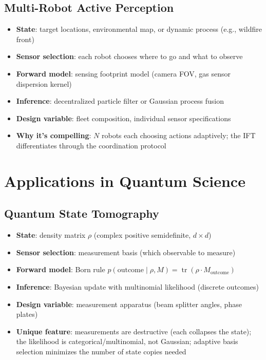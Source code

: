 \documentclass[11pt,a4paper]{article}
\newcommand{\tr}{\operatorname{tr}}
\begin{document}
\subsection{Multi-Robot Active Perception}

\begin{itemize}[nosep]
  \item \textbf{State}: target locations, environmental map, or dynamic process (e.g., wildfire front)
  \item \textbf{Sensor selection}: each robot chooses where to go and what to observe
  \item \textbf{Forward model}: sensing footprint model (camera FOV, gas sensor dispersion kernel)
  \item \textbf{Inference}: decentralized particle filter or Gaussian process fusion
  \item \textbf{Design variable}: fleet composition, individual sensor specifications
  \item \textbf{Why it's compelling}: $N$ robots each choosing actions adaptively; the IFT differentiates through the coordination protocol
\end{itemize}

\section{Applications in Quantum Science}

\subsection{Quantum State Tomography}

\begin{itemize}[nosep]
  \item \textbf{State}: density matrix $\rho$ (complex positive semidefinite, $d \times d$)
  \item \textbf{Sensor selection}: measurement basis (which observable to measure)
  \item \textbf{Forward model}: Born rule $p(\text{outcome} \mid \rho, M) = \tr(\rho \cdot M_{\text{outcome}})$
  \item \textbf{Inference}: Bayesian update with multinomial likelihood (discrete outcomes)
  \item \textbf{Design variable}: measurement apparatus (beam splitter angles, phase plates)
  \item \textbf{Unique feature}: measurements are destructive (each collapses the state); the likelihood is categorical/multinomial, not Gaussian; adaptive basis selection minimizes the number of state copies needed
\end{itemize}
\end{document}
